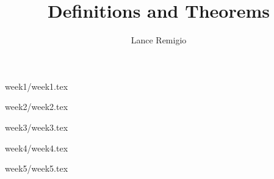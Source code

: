 \documentclass[a4paper]{article}
\title{Definitions and Theorems}
\author{Lance Remigio}
\begin{document}
\maketitle    

{week1/week1.tex}

{week2/week2.tex}

{week3/week3.tex}

{week4/week4.tex}

{week5/week5.tex}
\end{document}
